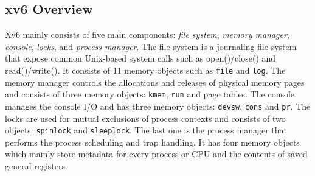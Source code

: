 \subsection{xv6 Overview}
Xv6 mainly consists of five main components: \emph{file system}, \emph{memory manager}, \emph{console}, \emph{locks}, and \emph{process manager}. The file system is a journaling file system that expose common Unix-based system calls such as \textsf{open()/close()} and \textsf{read()/write()}. It consists of 11 memory objects such as \texttt{file} and \texttt{log}. The memory manager controls the allocations and releases of physical memory pages and consists of three memory objects: \texttt{kmem}, \texttt{run} and page tables. The console manages the console I/O and has three memory objects: \texttt{devsw}, \texttt{cons} and \texttt{pr}. The locks are used for mutual exclusions of process contexts and consists of two objects: \texttt{spinlock} and \texttt{sleeplock}. The last one is the process manager that performs the process scheduling and trap handling. It has four memory objects which mainly store metadata for every process or CPU and the contents of saved general registers.

